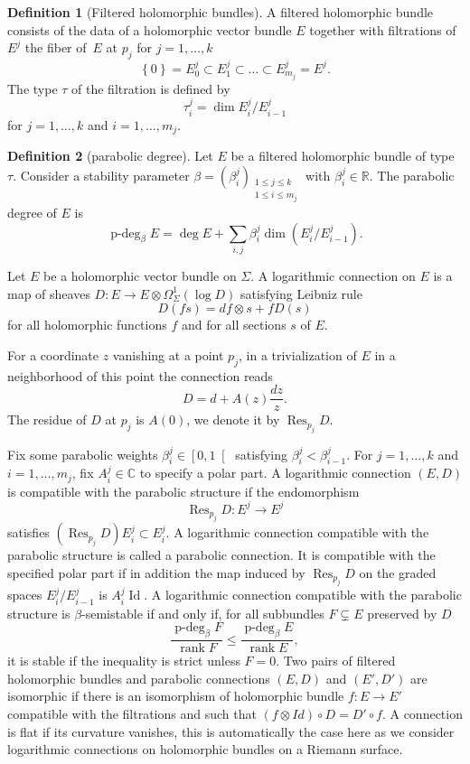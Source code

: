 \documentclass[JEP,XML,SOM,NoEqCountersInSection,Unicode,published]{cedram}
\theoremstyle{definition}
\newtheorem{definition}{Definition}[section]
\theoremstyle{plain}
\DeclareMathOperator{\Id}{Id}
\DeclareMathOperator{\Res}{Res}
\DeclareMathOperator{\rank}{rank}
\DeclareMathOperator{\pdeg}{p-deg}
\newcommand{\C}{\mathbb{C}}
\begin{document}
\begin{definition}[Filtered holomorphic bundles]
A filtered holomorphic bundle consists of the data of a holomorphic vector bundle $E$ together with filtrations of $E^j$ the fiber of~$E$ at $p_j$ for $j=1,\dots,k$
\[
\left\lbrace 0\right \rbrace = E^j_0 \subset E^j_1\subset\dots\subset E^j_{m_j} = E^j.
\]
The type $\tau$ of the filtration is defined by
\[
\tau^j_i =\dim E^j_i/E^j_{i-1}
\]
for $j=1,\dots,k$ and $i=1,\dots,m_j$.
\end{definition}
\begin{definition}[parabolic degree]
Let $E$ be a filtered holomorphic bundle of type~$\tau$. Consider a stability parameter $\beta=(\beta^j_i)_{\substack{1\le j \le k \\ 1 \le i \le m_j}}$ with $\beta_i^j\in\mathbb{R}$. The parabolic degree of $E$ is
\[
\pdeg_{\beta} E =\deg E + \sum_{i,j} \beta^j_i \dim(E^j_i/E^j_{i-1}).
\]
\end{definition}

Let $E$ be a holomorphic vector bundle on $\Sigma$. A logarithmic connection on $E$ is a map of sheaves $D: E\to E\otimes \Omega^1_{\Sigma}(\log D)$ satisfying Leibniz rule
\[
D(f s) = df\otimes s + f D(s)
\]
for all holomorphic functions $f$ and for all sections $s$ of $E$.

For a coordinate $z$ vanishing at a point $p_j$, in a trivialization of $E$ in a neighborhood of this point the connection reads
\[
D = d + A(z) \frac{d z}{z}.
\]
The residue of $D$ at $p_j$ is $A(0)$, we denote it by $\Res_{p_j} D$.

Fix some parabolic weights $\beta^j_i\in \left[ 0, 1\right[$ satisfying $\beta^j_i < \beta^j_{i-1}$. For $j=1,\dots, k$ and $i=1,\dots,m_j$, fix $A^j_i \in \C$ to specify a polar part. A logarithmic connection $(E,D)$ is compatible with the parabolic structure if the endomorphism
\[
\Res_{p_j} D : E^j \to E^j
\]
satisfies $\left(\Res_{p_j} D\right) E^j_i \subset E^j_{i}$. A logarithmic connection compatible with the parabolic structure is called a parabolic connection. It is compatible with the specified polar part if in addition the map induced by $\Res_{p_j} D$ on the graded spaces $ E^j_i/E^j_{i-1} $ is $A^j_i \Id$.
A logarithmic connection compatible with the parabolic structure is $\beta$-semistable if and only if, for all subbundles $F\subsetneq E$ preserved by $D$
\[
\frac{\pdeg_{\beta} F}{\rank F} \le \frac{\pdeg_{\beta} E}{\rank E},
\]
it is stable if the inequality is strict unless $F=0$. Two pairs of filtered holomorphic bundles and parabolic connections $(E,D)$ and $(E',D')$ are isomorphic if there is an isomorphism of holomorphic bundle $f:E\to E'$ compatible with the filtrations and such that $\left(f\otimes Id\right)\circ D = D'\circ f$. A connection is flat if its curvature vanishes, this is automatically the case here as we consider logarithmic connections on holomorphic bundles on a Riemann surface.
\end{document}
